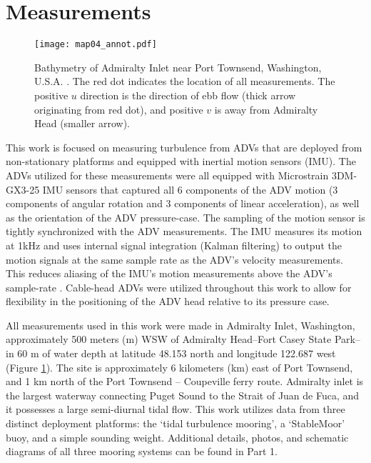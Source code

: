 
\section{Measurements}
\label{sec:meas}

\begin{figure}[t]
  \centering
  \texttt{[image: map04\_annot.pdf]}
  \caption{Bathymetry of Admiralty Inlet near Port Townsend, Washington, U.S.A. \cite[]{Finlayson2005}. The red dot indicates the location of all measurements. The positive $u$ direction is the direction of ebb flow (thick arrow originating from red dot), and positive $v$ is away from Admiralty Head (smaller arrow).}
  \label{fig:map}
\end{figure}

This work is focused on measuring turbulence from ADVs that are deployed from non-stationary platforms and equipped with inertial motion sensors (IMU). The ADVs utilized for these measurements were all equipped with Microstrain 3DM-GX3-25 IMU sensors that captured all 6 components of the ADV motion (3 components of angular rotation and 3 components of linear acceleration), as well as the orientation of the ADV pressure-case. The sampling of the motion sensor is tightly synchronized with the ADV measurements. The IMU measures its motion at 1kHz and uses internal signal integration (Kalman filtering) to output the motion signals at the same sample rate as the ADV's velocity measurements. This reduces aliasing of the IMU's motion measurements above the ADV's sample-rate \cite[]{3DM-GX3_coning_sculling}. Cable-head ADVs were utilized throughout this work to allow for flexibility in the positioning of the ADV head relative to its pressure case.

All measurements used in this work were made in Admiralty Inlet, Washington, approximately 500 meters (m) WSW of Admiralty Head--Fort Casey State Park--in 60 m of water depth at latitude 48.153 north and longitude 122.687 west (Figure \ref{fig:map}). The site is approximately 6 kilometers (km) east of Port Townsend, and 1 km north of the Port Townsend -- Coupeville ferry route.  Admiralty inlet is the largest waterway connecting Puget Sound to the Strait of Juan de Fuca, and it possesses a large semi-diurnal tidal flow.  This work utilizes data from three distinct deployment platforms: the `tidal turbulence mooring', a `StableMoor' buoy, and a simple sounding weight.  Additional details, photos, and schematic diagrams of all three mooring systems can be found in Part 1.

